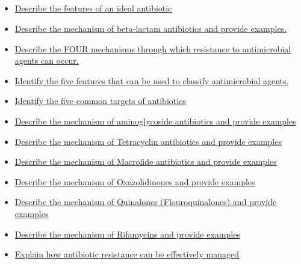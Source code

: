 \documentclass[10pt, a4paper]{article}
\begin{document}
\subsection{} \begin{itemize} \item \href{https://www.notion.so/de11c09d6403468fb968a4ac67d9316d}{Describe the features of an ideal antibiotic} \item \href{https://www.notion.so/fe23a948bc20498ea03b7f8f66c04761}{Describe the mechanism of beta-lactam antibiotics and provide examples.} \item \href{https://www.notion.so/616ba1585d964aa99e2c8cf86549e740}{Describe the FOUR mechanisms through which resistance to antimicrobial agents can occur.} \item \href{https://www.notion.so/b3b90e7188ea45ac805daab05e856c12}{Identify the five features that can be used to classify antimicrobial agents.} \item \href{https://www.notion.so/4313dc6b11f545ac9f73d96f18e62a16}{Identify the five common targets of antibiotics} \item \href{https://www.notion.so/d2d8126ff76949b9a3249062997a43ac}{Describe the mechanism of aminoglycoside antibiotics and provide examples} \item \href{https://www.notion.so/852e52c1e59048f48f0559c2cddfb742}{Describe the mechanism of Tetracyclin antibiotics and provide examples} \item \href{https://www.notion.so/5303415733a94f5992e69227cde960fb}{Describe the mechanism of Macrolide antibiotics and provide examples} \item \href{https://www.notion.so/7ca85911e5c347d791b922449913685e}{Describe the mechanism of Oxazolidinones and provide examples} \item \href{https://www.notion.so/b71b921d0c4140b09429e92509280f2c}{Describe the mechanism of Quinalones (Flouroquinalones) and provide examples} \item \href{https://www.notion.so/5a773187162f4bd5a0efc6d8660b1647}{Describe the mechanism of Rifamycins and provide examples} \item \href{https://www.notion.so/26a67cd59bdc476f9f55d4d540dd5445}{Explain how antibiotic resistance can be effectively managed} \end{itemize}
\end{document}
